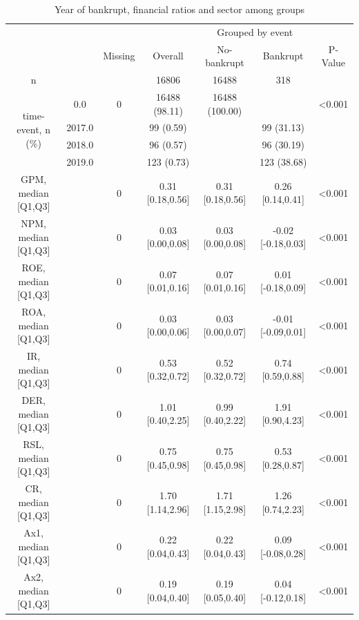 \documentclass[journal]{IEEEtai}
\begin{document}
\begin{table}[!h]
    \caption{Year of bankrupt, financial ratios and sector among groups}
    \label{tableone}
\setlength\tabcolsep{15pt}
\ContinuedFloat
    \centering
\begin{tabular*}{\textwidth}{@{}*{7}{c}} 
\toprule
& & & & \multicolumn{2}{c}{Grouped by event} \\
 \cmidrule{5-6}
 &  & Missing & Overall & No-bankrupt & Bankrupt & P-Value \\
n &  &  & 16806 & 16488 & 318 &  \\
\cline{1-7}

\multirow[t]{4}{*}{time-event, n (\%)}  & 0.0 & 0 & 16488 (98.11) & 16488 (100.00) &  & <0.001 \\
 & 2017.0 &  & 99 (0.59) &  & 99 (31.13) &  \\
 & 2018.0 &  & 96 (0.57) &  & 96 (30.19) &  \\
 & 2019.0 &  & 123 (0.73) &  & 123 (38.68) &  \\
 
GPM, median [Q1,Q3] &  & 0 & 0.31 [0.18,0.56] & 0.31 [0.18,0.56] & 0.26 [0.14,0.41] & <0.001 \\
NPM, median [Q1,Q3] &  & 0 & 0.03 [0.00,0.08] & 0.03 [0.00,0.08] & -0.02 [-0.18,0.03] & <0.001 \\
ROE, median [Q1,Q3] &  & 0 & 0.07 [0.01,0.16] & 0.07 [0.01,0.16] & 0.01 [-0.18,0.09] & <0.001 \\
ROA, median [Q1,Q3] &  & 0 & 0.03 [0.00,0.06] & 0.03 [0.00,0.07] & -0.01 [-0.09,0.01] & <0.001 \\
IR, median [Q1,Q3] &  & 0 & 0.53 [0.32,0.72] & 0.52 [0.32,0.72] & 0.74 [0.59,0.88] & <0.001 \\
DER, median [Q1,Q3] &  & 0 & 1.01 [0.40,2.25] & 0.99 [0.40,2.22] & 1.91 [0.90,4.23] & <0.001 \\
RSL, median [Q1,Q3] &  & 0 & 0.75 [0.45,0.98] & 0.75 [0.45,0.98] & 0.53 [0.28,0.87] & <0.001 \\
CR, median [Q1,Q3] &  & 0 & 1.70 [1.14,2.96] & 1.71 [1.15,2.98] & 1.26 [0.74,2.23] & <0.001 \\
Ax1, median [Q1,Q3] &  & 0 & 0.22 [0.04,0.43] & 0.22 [0.04,0.43] & 0.09 [-0.08,0.28] & <0.001 \\
Ax2, median [Q1,Q3] &  & 0 & 0.19 [0.04,0.40] & 0.19 [0.05,0.40] & 0.04 [-0.12,0.18] & <0.001 \\



\end{tabular*}
\end{table}
\end{document}
